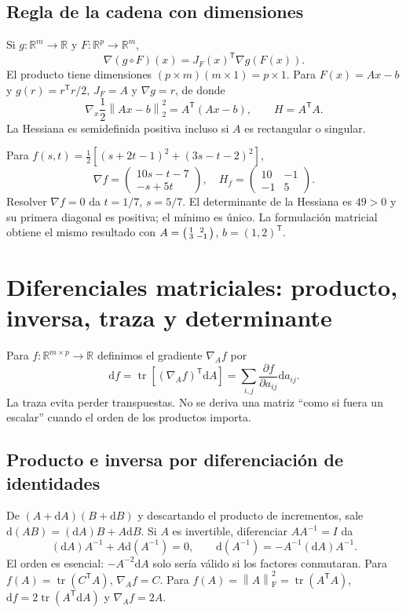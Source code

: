 \documentclass[11pt,a4paper]{article}
\newcommand{\R}{\mathbb R}
\newcommand{\T}{^{\mathsf T}}
\newcommand{\norm}[1]{\left\lVert #1\right\rVert}
\DeclareMathOperator{\tr}{tr}
\newcommand{\F}{_{\mathrm F}}
\theoremstyle{definition}
\begin{document}
\subsection{Regla de la cadena con dimensiones}
Si $g:\R^m\to\R$ y $F:\R^p\to\R^m$,
\[
\nabla(g\circ F)(x)=J_F(x)\T\nabla g(F(x)).
\]
El producto tiene dimensiones $(p\times m)(m\times1)=p\times1$. Para $F(x)=Ax-b$ y $g(r)=r\T r/2$, $J_F=A$ y $\nabla g=r$, de donde
\[
\nabla_x\frac12\norm{Ax-b}_2^2=A\T(Ax-b),\qquad H=A\T A.
\]
La Hessiana es semidefinida positiva incluso si $A$ es rectangular o singular.
\begin{ejemplo}
Para $f(s,t)=\tfrac12[(s+2t-1)^2+(3s-t-2)^2]$,
\[
\nabla f=\begin{pmatrix}10s-t-7\\-s+5t\end{pmatrix},\quad
H_f=\begin{pmatrix}10&-1\\-1&5\end{pmatrix}.
\]
Resolver $\nabla f=0$ da $t=1/7$, $s=5/7$. El determinante de la Hessiana es $49>0$ y su primera diagonal es positiva; el mínimo es único. La formulación matricial obtiene el mismo resultado con $A=\begin{psmallmatrix}1&2\\3&-1\end{psmallmatrix}$, $b=(1,2)\T$.
\end{ejemplo}

\section{Diferenciales matriciales: producto, inversa, traza y determinante}
Para $f:\R^{m\times p}\to\R$ definimos el gradiente $\nabla_A f$ por
\[
\mathrm df=\tr[(\nabla_A f)\T\mathrm dA]
=\sum_{i,j}\frac{\partial f}{\partial a_{ij}}\mathrm da_{ij}.
\]
La traza evita perder transpuestas. No se deriva una matriz ``como si fuera un escalar'' cuando el orden de los productos importa.
\subsection{Producto e inversa por diferenciación de identidades}
De $(A+\mathrm dA)(B+\mathrm dB)$ y descartando el producto de incrementos, sale $\mathrm d(AB)=(\mathrm dA)B+A\mathrm dB$. Si $A$ es invertible, diferenciar $AA^{-1}=I$ da
\[
(\mathrm dA)A^{-1}+A\mathrm d(A^{-1})=0,
\qquad\boxed{\mathrm d(A^{-1})=-A^{-1}(\mathrm dA)A^{-1}}.
\]
El orden es esencial: $-A^{-2}\mathrm dA$ solo sería válido si los factores conmutaran. Para $f(A)=\tr(C\T A)$, $\nabla_A f=C$. Para $f(A)=\norm A\F^2=\tr(A\T A)$, $\mathrm df=2\tr(A\T\mathrm dA)$ y $\nabla_A f=2A$.
\end{document}

